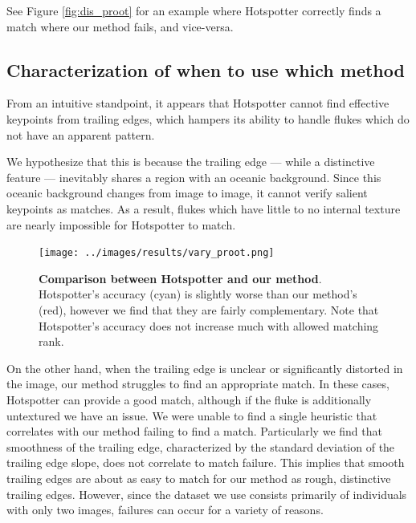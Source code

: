 See Figure \ref{fig:dis_proot} for an example where Hotspotter correctly finds a match where our method fails, and vice-versa.

\subsection{Characterization of when to use which method}

From an intuitive standpoint, it appears that Hotspotter cannot find effective keypoints from trailing edges, which hampers its ability to handle flukes which do not have an apparent pattern.

We hypothesize that this is because the trailing edge --- while a distinctive feature --- inevitably shares a region with an oceanic background.
Since this oceanic background changes from image to image, it cannot verify salient keypoints as matches.
As a result, flukes which have little to no internal texture are nearly impossible for Hotspotter to match.

\begin{figure}[t]%
\centering
\texttt{[image: ../images/results/vary\_proot.png]}
\caption{\textbf{Comparison between Hotspotter and our method}. Hotspotter's accuracy (cyan) is slightly worse than our method's (red), however we find that they are fairly complementary. Note that Hotspotter's accuracy does not increase much with allowed matching rank.}
\label{fig:vary_proot}
\end{figure}



On the other hand, when the trailing edge is unclear or significantly distorted in the image, our method struggles to find an appropriate match.
In these cases, Hotspotter can provide a good match, although if the fluke is additionally untextured we have an issue.
We were unable to find a single heuristic that correlates with our method failing to find a match.
Particularly we find that smoothness of the trailing edge, characterized by the standard deviation of the trailing edge slope, does not correlate to match failure.
This implies that smooth trailing edges are about as easy to match for our method as rough, distinctive trailing edges.
However, since the dataset we use consists primarily of individuals with only two images, failures can occur for a variety of reasons.


